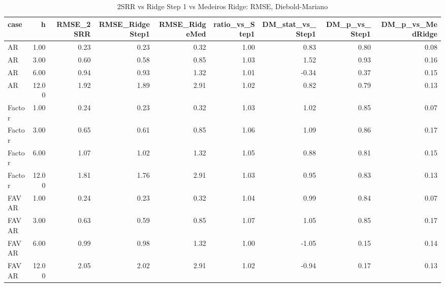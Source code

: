 \begin{table}[ht]
\centering
\begin{tabular}{lrrrrrrrr}
  \hline
case & h & RMSE\_2SRR & RMSE\_RidgeStep1 & RMSE\_RidgeMed & ratio\_vs\_Step1 & DM\_stat\_vs\_Step1 & DM\_p\_vs\_Step1 & DM\_p\_vs\_MedRidge \\ 
  \hline
AR & 1.00 & 0.23 & 0.23 & 0.32 & 1.00 & 0.83 & 0.80 & 0.08 \\ 
  AR & 3.00 & 0.60 & 0.58 & 0.85 & 1.03 & 1.52 & 0.93 & 0.16 \\ 
  AR & 6.00 & 0.94 & 0.93 & 1.32 & 1.01 & -0.34 & 0.37 & 0.15 \\ 
  AR & 12.00 & 1.92 & 1.89 & 2.91 & 1.02 & 0.82 & 0.79 & 0.13 \\ 
  Factor & 1.00 & 0.24 & 0.23 & 0.32 & 1.03 & 1.02 & 0.85 & 0.07 \\ 
  Factor & 3.00 & 0.65 & 0.61 & 0.85 & 1.06 & 1.09 & 0.86 & 0.17 \\ 
  Factor & 6.00 & 1.07 & 1.02 & 1.32 & 1.05 & 0.88 & 0.81 & 0.15 \\ 
  Factor & 12.00 & 1.81 & 1.76 & 2.91 & 1.03 & 0.95 & 0.83 & 0.13 \\ 
  FAVAR & 1.00 & 0.24 & 0.23 & 0.32 & 1.04 & 0.99 & 0.84 & 0.07 \\ 
  FAVAR & 3.00 & 0.63 & 0.59 & 0.85 & 1.07 & 1.05 & 0.85 & 0.17 \\ 
  FAVAR & 6.00 & 0.99 & 0.98 & 1.32 & 1.00 & -1.05 & 0.15 & 0.14 \\ 
  FAVAR & 12.00 & 2.05 & 2.02 & 2.91 & 1.02 & -0.94 & 0.17 & 0.13 \\ 
   \hline
\end{tabular}
\caption{2SRR vs Ridge Step 1 vs Medeiros Ridge: RMSE, Diebold-Mariano} 
\label{tab:2srr_vs_ridge}
\end{table}
